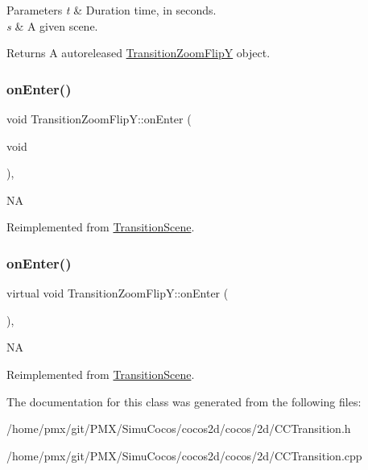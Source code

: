 \begin{DoxyParams}{Parameters}
{\em t} & Duration time, in seconds. \\
\hline
{\em s} & A given scene. \\
\hline
\end{DoxyParams}
\begin{DoxyReturn}{Returns}
A autoreleased \hyperlink{classTransitionZoomFlipY}{Transition\+Zoom\+FlipY} object. 
\end{DoxyReturn}
\mbox{\label{classTransitionZoomFlipY_a6909fa709a95fbd9b3556399ee00c215}} 
\subsubsection{\texorpdfstring{on\+Enter()}{onEnter()}\hspace{0.1cm}{\footnotesize\ttfamily [1/2]}}
{\footnotesize\ttfamily void Transition\+Zoom\+Flip\+Y\+::on\+Enter (\begin{DoxyParamCaption}\item[{void}]{ }\end{DoxyParamCaption})\hspace{0.3cm}{\ttfamily [override]}, {\ttfamily [virtual]}}

NA 

Reimplemented from \hyperlink{classTransitionScene_aace390a1bd8f3c73bb650a1e256a0f83}{Transition\+Scene}.

\mbox{\label{classTransitionZoomFlipY_a0a91781c926ef8dd5942897c599dc961}} 
\subsubsection{\texorpdfstring{on\+Enter()}{onEnter()}\hspace{0.1cm}{\footnotesize\ttfamily [2/2]}}
{\footnotesize\ttfamily virtual void Transition\+Zoom\+Flip\+Y\+::on\+Enter (\begin{DoxyParamCaption}{ }\end{DoxyParamCaption})\hspace{0.3cm}{\ttfamily [override]}, {\ttfamily [virtual]}}

NA 

Reimplemented from \hyperlink{classTransitionScene_aace390a1bd8f3c73bb650a1e256a0f83}{Transition\+Scene}.



The documentation for this class was generated from the following files\+:\begin{DoxyCompactItemize}
\item 
/home/pmx/git/\+P\+M\+X/\+Simu\+Cocos/cocos2d/cocos/2d/C\+C\+Transition.\+h\item 
/home/pmx/git/\+P\+M\+X/\+Simu\+Cocos/cocos2d/cocos/2d/C\+C\+Transition.\+cpp\end{DoxyCompactItemize}
